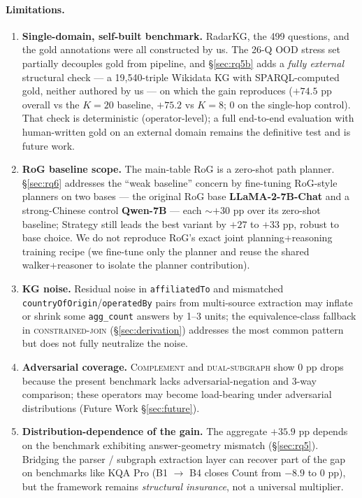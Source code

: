\documentclass[review]{elsarticle}
\newcommand{\qtype}[1]{\texttt{\small #1}}
\newcommand{\op}[1]{\textsc{\small #1}}
\begin{document}
\paragraph{Limitations.}
\begin{enumerate}[topsep=0pt,itemsep=2pt,leftmargin=*]
  \item \textbf{Single-domain, self-built benchmark.} RadarKG, the 499 questions, and the gold annotations were all constructed by us. The 26-Q OOD stress set partially decouples gold from pipeline, and §\ref{sec:rq5b} adds a \emph{fully external} structural check --- a 19{,}540-triple Wikidata KG with SPARQL-computed gold, neither authored by us --- on which the gain reproduces ($+74.5$ pp overall vs the $K{=}20$ baseline, $+75.2$ vs $K{=}8$; $0$ on the single-hop control). That check is deterministic (operator-level); a full end-to-end evaluation with human-written gold on an external domain remains the definitive test and is future work.
  \item \textbf{RoG baseline scope.} The main-table RoG is a zero-shot path planner. §\ref{sec:rq6} addresses the ``weak baseline'' concern by fine-tuning RoG-style planners on two bases --- the original RoG base \textbf{LLaMA-2-7B-Chat} \citep{luo2024rog} and a strong-Chinese control \textbf{Qwen-7B} --- each ${\sim}{+}30$ pp over its zero-shot baseline; Strategy still leads the best variant by $+27$ to $+33$ pp, robust to base choice. We do not reproduce RoG's exact joint planning+reasoning training recipe (we fine-tune only the planner and reuse the shared walker+reasoner to isolate the planner contribution).
  \item \textbf{KG noise.} Residual noise in \texttt{affiliatedTo} and mismatched \texttt{countryOfOrigin}/\texttt{operatedBy} pairs from multi-source extraction may inflate or shrink some \qtype{agg\_count} answers by 1--3 units; the equivalence-class fallback in \op{constrained-join} (§\ref{sec:derivation}) addresses the most common pattern but does not fully neutralize the noise.
  \item \textbf{Adversarial coverage.} \op{Complement} and \op{dual-subgraph} show 0 pp drops because the present benchmark lacks adversarial-negation and 3-way comparison; these operators may become load-bearing under adversarial distributions (Future Work §\ref{sec:future}).
  \item \textbf{Distribution-dependence of the gain.} The aggregate $+35.9$ pp depends on the benchmark exhibiting answer-geometry mismatch (§\ref{sec:rq5}). Bridging the parser / subgraph extraction layer can recover part of the gap on benchmarks like KQA Pro (B1 $\to$ B4 closes Count from $-8.9$ to 0 pp), but the framework remains \emph{structural insurance}, not a universal multiplier.

\end{enumerate}
\end{document}
